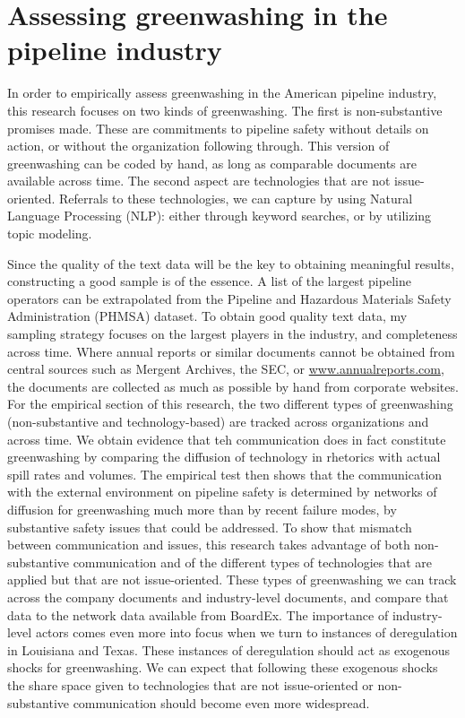 \section{Assessing greenwashing in the pipeline industry}

In order to empirically assess greenwashing in the American pipeline industry, this research focuses on two kinds of greenwashing. The first is non-substantive promises made. These are commitments to pipeline safety without details on action, or without the organization following through. This version of greenwashing can be coded by hand, as long as comparable documents are available across time. The second aspect are technologies that are not issue-oriented. Referrals to these technologies, we can capture by using Natural Language Processing (NLP): either through keyword searches, or by utilizing topic modeling.

Since the quality of the text data will be the key to obtaining meaningful results, constructing a good sample is of the essence. A list of the largest pipeline operators can be extrapolated from the Pipeline and Hazardous Materials Safety Administration (PHMSA) dataset. To obtain good quality text data, my sampling strategy focuses on the largest players in the industry, and completeness across time. Where annual reports or similar documents cannot be obtained from central sources such as Mergent Archives, the SEC, or \url{www.annualreports.com}, the documents are collected as much as possible by hand from corporate websites. For the empirical section of this research, the two different types of greenwashing (non-substantive and technology-based) are tracked across organizations and across time. We obtain evidence that teh communication does in fact constitute greenwashing by comparing the diffusion of technology in rhetorics with actual spill rates and volumes. The empirical test then shows that the communication with the external environment on pipeline safety is determined by networks of diffusion for greenwashing much more than by recent failure modes, by substantive safety issues that could be addressed. To show that mismatch between communication and issues, this research takes advantage of both non-substantive communication and of the different types of technologies that are applied but that are not issue-oriented. These types of greenwashing we can track across the company documents and industry-level documents, and compare that data to the network data available from BoardEx. The importance of industry-level actors comes even more into focus when we turn to instances of deregulation in Louisiana and Texas. These instances of deregulation should act as exogenous shocks for greenwashing. We can expect that following these exogenous shocks the share space given to technologies that are not issue-oriented or non-substantive communication should become even more widespread.